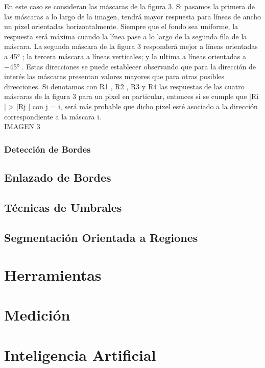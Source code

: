 \documentclass[14pt]{article}
\begin{document}
En este caso se consideran las máscaras de la ﬁgura 3. Si pasamos la primera de las máscaras a lo largo de la imagen, tendrá mayor respuesta para líneas de ancho un pixel orientadas horizontalmente. Siempre que el fondo sea uniforme, la respuesta será máxima cuando la línea pase a lo largo de la segunda ﬁla de la máscara. La segunda máscara de la ﬁgura 3 responderá mejor a líneas orientadas a 45° ; la tercera máscara a líneas verticales; y la ultima a líneas orientadas a −45° . Estas direcciones se puede establecer observando que para la dirección de interés las máscaras presentan valores mayores que para otras posibles direcciones. Si denotamos con R1 , R2 , R3 y R4 las respuestas de las cuatro máscaras de la ﬁgura 3 para un pixel en particular, entonces si se cumple que |Ri | > |Rj | con j = i, será más probable que dicho pixel esté asociado a la dirección correspondiente a la máscara i.\\
IMAGEN 3

\subsubsection{Detección de Bordes}



\subsection{Enlazado de Bordes}



\subsection{Técnicas de Umbrales}



\subsection{Segmentación Orientada a Regiones}



\section{Herramientas}
\section{Medición}
\section{Inteligencia Artificial}
\end{document}
